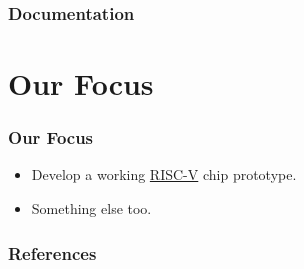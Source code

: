 \documentclass{weeklyslides}
\begin{document}
\subsubsection{Documentation}\label{subsubsec:Doc}
\begin{frame}
  \frametitle{}
\end{frame}


\section{Our Focus}\label{sec:Our_Focus}
\begin{frame}
  \frametitle{Our Focus}
  \begin{itemize}
  \item Develop a working \href{https://riscv.org/}{RISC-V} chip prototype.
  \item Something else too.
  \end{itemize}

\end{frame}

\begin{frame}
  \frametitle{References}
  \printbibliography{}
\end{frame}
\end{document}
